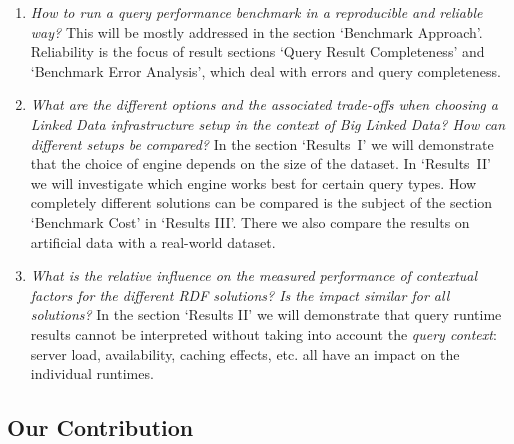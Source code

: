 \documentclass[twocolumn]{bmcart}%
\begin{document}
\begin{enumerate}
	\item \textit{How to run a query performance benchmark in a reproducible and reliable way?}
	This will be mostly addressed in the section `Benchmark Approach'. Reliability is the focus of result sections `Query Result Completeness' and `Benchmark Error Analysis', 
	which deal with errors and query completeness. 
	
	\item \textit{What are the different options and the associated trade-offs when choosing a Linked Data infrastructure setup in the context of Big Linked Data? How can different setups be compared? }
	In the section `Results~I' we will demonstrate that the choice of engine depends on the size of the dataset. In `Results~II' we will investigate which engine works best for certain query types. How completely different solutions can be compared is the subject of the section `Benchmark Cost' in `Results III'. There we also compare the results on artificial data with a real-world dataset.
	
	\item \textit{What is the relative influence on the measured performance of contextual factors for the different RDF solutions? Is the impact similar for all solutions?}
	In the section `Results II' we will demonstrate that query runtime results cannot be interpreted without taking into account the \emph{query context}: server load, availability, caching effects, etc. all have an impact on the individual runtimes.
	
	
\end{enumerate}
%

\subsection{Our Contribution}
%
\end{document}
